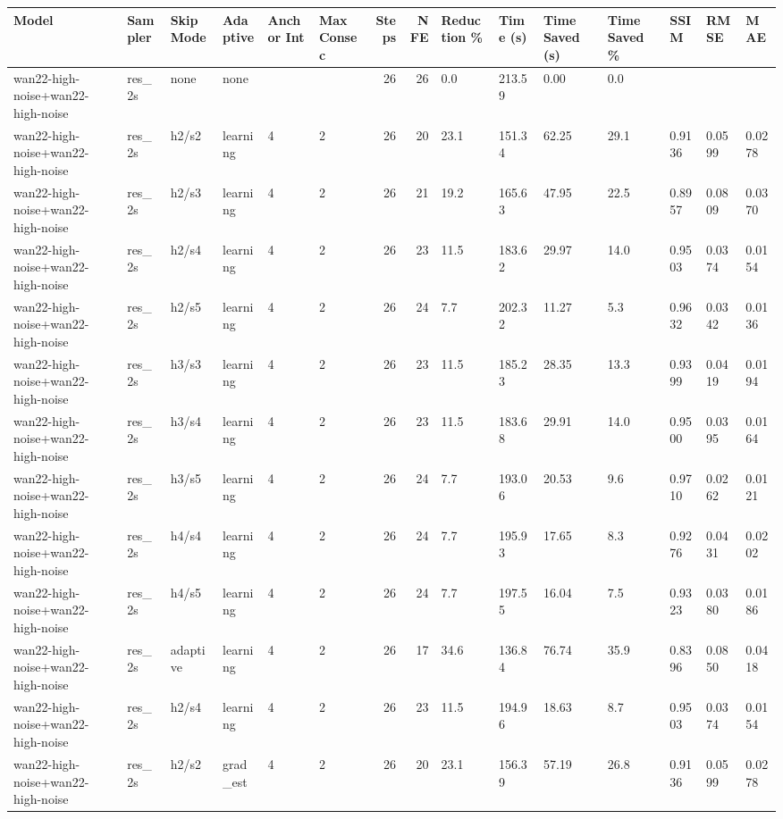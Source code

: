 \begin{tabular}{llllllrrlllllll}
\toprule
Model & Sampler & Skip Mode & Adaptive & Anchor Int & Max Consec & Steps & NFE & Reduction \% & Time (s) & Time Saved (s) & Time Saved \% & SSIM & RMSE & MAE \\
\midrule
wan22-high-noise+wan22-high-noise & res_2s & none & none &  &  & 26 & 26 & 0.0 & 213.59 & 0.00 & 0.0 &  &  &  \\
wan22-high-noise+wan22-high-noise & res_2s & h2/s2 & learning & 4 & 2 & 26 & 20 & 23.1 & 151.34 & 62.25 & 29.1 & 0.9136 & 0.0599 & 0.0278 \\
wan22-high-noise+wan22-high-noise & res_2s & h2/s3 & learning & 4 & 2 & 26 & 21 & 19.2 & 165.63 & 47.95 & 22.5 & 0.8957 & 0.0809 & 0.0370 \\
wan22-high-noise+wan22-high-noise & res_2s & h2/s4 & learning & 4 & 2 & 26 & 23 & 11.5 & 183.62 & 29.97 & 14.0 & 0.9503 & 0.0374 & 0.0154 \\
wan22-high-noise+wan22-high-noise & res_2s & h2/s5 & learning & 4 & 2 & 26 & 24 & 7.7 & 202.32 & 11.27 & 5.3 & 0.9632 & 0.0342 & 0.0136 \\
wan22-high-noise+wan22-high-noise & res_2s & h3/s3 & learning & 4 & 2 & 26 & 23 & 11.5 & 185.23 & 28.35 & 13.3 & 0.9399 & 0.0419 & 0.0194 \\
wan22-high-noise+wan22-high-noise & res_2s & h3/s4 & learning & 4 & 2 & 26 & 23 & 11.5 & 183.68 & 29.91 & 14.0 & 0.9500 & 0.0395 & 0.0164 \\
wan22-high-noise+wan22-high-noise & res_2s & h3/s5 & learning & 4 & 2 & 26 & 24 & 7.7 & 193.06 & 20.53 & 9.6 & 0.9710 & 0.0262 & 0.0121 \\
wan22-high-noise+wan22-high-noise & res_2s & h4/s4 & learning & 4 & 2 & 26 & 24 & 7.7 & 195.93 & 17.65 & 8.3 & 0.9276 & 0.0431 & 0.0202 \\
wan22-high-noise+wan22-high-noise & res_2s & h4/s5 & learning & 4 & 2 & 26 & 24 & 7.7 & 197.55 & 16.04 & 7.5 & 0.9323 & 0.0380 & 0.0186 \\
wan22-high-noise+wan22-high-noise & res_2s & adaptive & learning & 4 & 2 & 26 & 17 & 34.6 & 136.84 & 76.74 & 35.9 & 0.8396 & 0.0850 & 0.0418 \\
wan22-high-noise+wan22-high-noise & res_2s & h2/s4 & learning & 4 & 2 & 26 & 23 & 11.5 & 194.96 & 18.63 & 8.7 & 0.9503 & 0.0374 & 0.0154 \\
wan22-high-noise+wan22-high-noise & res_2s & h2/s2 & grad_est & 4 & 2 & 26 & 20 & 23.1 & 156.39 & 57.19 & 26.8 & 0.9136 & 0.0599 & 0.0278 \\

\end{tabular}
